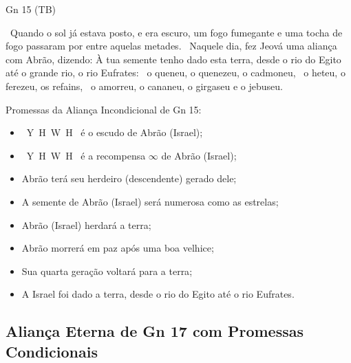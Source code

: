 \documentclass[12pt,aspectratio=169]{beamer}
\newcommand{\YA}{%
    \mbox{%
        Y\makebox[0pt][l]{\hspace{-0.178em}\raisebox{-0.00ex}{\scalebox{0.30}{E}}}%
        H\makebox[0pt][l]{\hspace{-0.010em}\raisebox{-0.00ex}{\scalebox{0.30}{O}}}%
        W\makebox[0pt][l]{\hspace{-0.245em}\raisebox{-0.00ex}{\scalebox{0.30}{A}}}%
        H%
    }%
}
\newcommand{\ver}[1]{%
    \raisebox{0.50ex}{%
        \scalebox{1.1}{%
            \pmb{\textbf{\textcolor{BSpbg}{#1}}}%
        }%
    }%
}
\newcommand{\QUOTE}[1]{%
    \par\noindent\hspace*{0.05\linewidth}%
    \begin{minipage}{0.9\linewidth}%
        \linespread{1.35}\large{#1}%
    \end{minipage}%
}
\newcommand{\YEL}[1]{{\textcolor{TXyel}{#1}}}
\newcommand{\GRE}[1]{{\textcolor{TXgre}{#1}}}
\newcommand{\CYA}[1]{{\textcolor{TXcya}{#1}}}
\newcommand{\BRI}[1]{{\textcolor{BSpbg}{#1}}}   %
\begin{document}
    \begin{frame}{Gn 15 (TB)}
        \QUOTE{%
            \ver{17}~Quando o sol já estava posto, e era escuro, um \YEL{fogo fumegante e uma
            tocha de fogo passaram por entre aquelas metades}.
            \ver{18}~Naquele dia, \YEL{fez Jeová uma aliança com Abrão}, dizendo: \GRE{À tua
            semente tenho dado esta terra, desde o rio do Egito até o grande rio, o rio
            Eufrates}:
            \ver{19}~o queneu, o quenezeu, o cadmoneu,
            \ver{20}~o heteu, o ferezeu, os refains,
            \ver{21}~o amorreu, o cananeu, o girgaseu e o jebuseu.
        }
    \end{frame}

    \begin{frame}{Promessas da \YEL{Aliança Incondicional} de \BRI{Gn 15}:}
        \begin{itemize}
            \item<1-> \BRI{\YA} é o \YEL{escudo} de Abrão (Israel);
            \item<1-> \BRI{\YA} é a \YEL{recompensa} $\infty$ de Abrão (Israel);
            \item<1-> Abrão terá seu herdeiro (descendente) \YEL{gerado dele};
            \item<1-> A semente de Abrão (Israel) será \YEL{numerosa} como as \CYA{estrelas};
            \item<2-> Abrão (Israel) \YEL{herdará} a \YEL{terra};
            \item<2-> Abrão morrerá em \YEL{paz} após uma \YEL{boa velhice};
            \item<2-> Sua quarta geração \YEL{voltará} para a \YEL{terra};
            \item<2-> \YEL{A Israel foi dado a terra, desde o rio do Egito até o rio Eufrates}.
        \end{itemize}
    \end{frame}

    \subsection{\BRI{Aliança Eterna} de Gn 17 com Promessas Condicionais}
\end{document}

